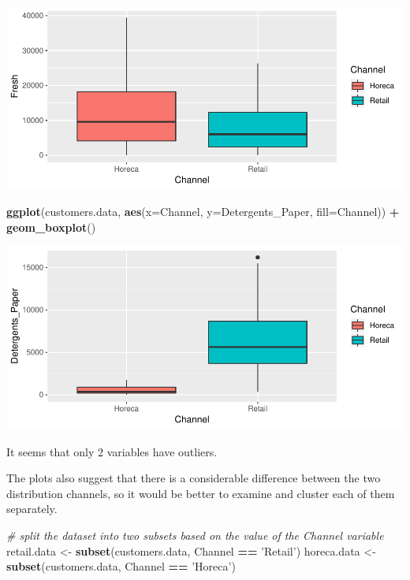 \documentclass[]{article}
\newenvironment{Shaded}{\begin{snugshade}}{\end{snugshade}}
\newcommand{\KeywordTok}[1]{\textcolor[rgb]{0.13,0.29,0.53}{\textbf{#1}}}
\newcommand{\DataTypeTok}[1]{\textcolor[rgb]{0.13,0.29,0.53}{#1}}
\newcommand{\StringTok}[1]{\textcolor[rgb]{0.31,0.60,0.02}{#1}}
\newcommand{\CommentTok}[1]{\textcolor[rgb]{0.56,0.35,0.01}{\textit{#1}}}
\newcommand{\OperatorTok}[1]{\textcolor[rgb]{0.81,0.36,0.00}{\textbf{#1}}}
\newcommand{\NormalTok}[1]{#1}
\begin{document}
\begin{center}\includegraphics{7._K-means_Clustering_files/figure-latex/unnamed-chunk-8-5} \end{center}

\begin{Shaded}
\begin{Highlighting}[]
\KeywordTok{ggplot}\NormalTok{(customers.data, }\KeywordTok{aes}\NormalTok{(}\DataTypeTok{x=}\NormalTok{Channel, }\DataTypeTok{y=}\NormalTok{Detergents_Paper, }\DataTypeTok{fill=}\NormalTok{Channel)) }\OperatorTok{+}\StringTok{ }\KeywordTok{geom_boxplot}\NormalTok{()}
\end{Highlighting}
\end{Shaded}

\begin{center}\includegraphics{7._K-means_Clustering_files/figure-latex/unnamed-chunk-8-6} \end{center}

It seems that only 2 variables have outliers.

The plots also suggest that there is a considerable difference between
the two distribution channels, so it would be better to examine and
cluster each of them separately.

\begin{Shaded}
\begin{Highlighting}[]
\CommentTok{# split the dataset into two subsets based on the value of the Channel variable}
\NormalTok{retail.data <-}\StringTok{ }\KeywordTok{subset}\NormalTok{(customers.data, Channel }\OperatorTok{==}\StringTok{ 'Retail'}\NormalTok{)}
\NormalTok{horeca.data <-}\StringTok{ }\KeywordTok{subset}\NormalTok{(customers.data, Channel }\OperatorTok{==}\StringTok{ 'Horeca'}\NormalTok{)}
\end{Highlighting}
\end{Shaded}
\end{document}
